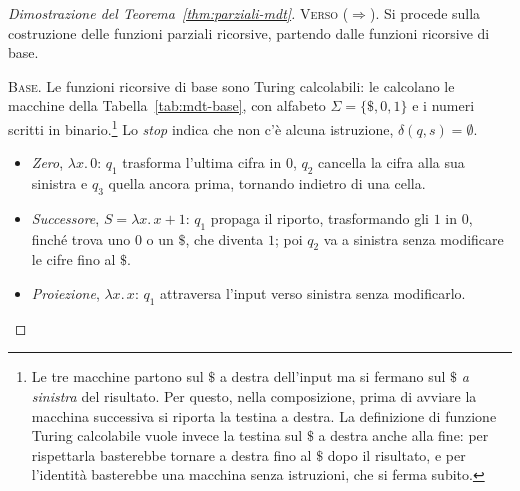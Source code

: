 \documentclass[a4paper, 11pt, oneside]{book}
\theoremstyle{formale}
\begin{document}
    \begin{proof}[Dimostrazione del Teorema~\ref{thm:parziali-mdt}]
        \textsc{Verso ($\Rightarrow$)}. Si procede sulla costruzione delle funzioni
        parziali ricorsive, partendo dalle funzioni ricorsive di base.

        \medskip
        \textsc{Base}. Le funzioni ricorsive di base sono Turing calcolabili: le calcolano le
        macchine della Tabella~\ref{tab:mdt-base}, con alfabeto $\Sigma = \{\$, 0, 1\}$ e i
        numeri scritti in binario.\footnote{Le tre macchine partono sul $\$$ a destra
        dell'input ma si fermano sul $\$$ \emph{a sinistra} del risultato. Per questo, nella
        composizione, prima di avviare la macchina successiva si riporta la testina a
        destra. La definizione di funzione Turing calcolabile vuole invece la testina sul
        $\$$ a destra anche alla fine: per rispettarla basterebbe tornare a destra fino al
        $\$$ dopo il risultato, e per l'identit\`a basterebbe una macchina senza istruzioni,
        che si ferma subito.} Lo \emph{stop} indica che non c'\`e
        alcuna istruzione, $\delta(q, s) = \emptyset$.
        \begin{itemize}
            \item \emph{Zero}, $\lambda x.\, 0$: $q_1$ trasforma l'ultima cifra in $0$, $q_2$
                cancella la cifra alla sua sinistra e $q_3$ quella ancora prima, tornando
                indietro di una cella.
            \item \emph{Successore}, $S = \lambda x.\, x + 1$: $q_1$ propaga il riporto,
                trasformando gli $1$ in $0$, finch\'e trova uno $0$ o un $\$$, che diventa
                $1$; poi $q_2$ va a sinistra senza modificare le cifre fino al $\$$.
            \item \emph{Proiezione}, $\lambda x.\, x$: $q_1$ attraversa l'input verso sinistra
                senza modificarlo.
        \end{itemize}


\end{proof}
\end{document}
